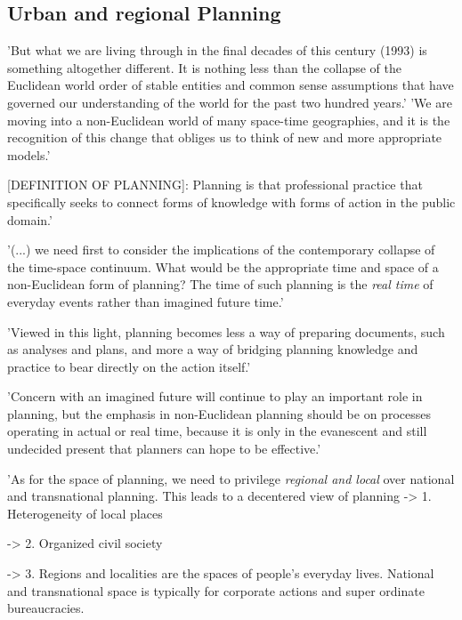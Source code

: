 \subsection{Urban and regional Planning}
\parencite{Friedmann1993}
'But what we are living through in the final decades of this century (1993) is something altogether different. It is nothing less than the collapse of the Euclidean world order of stable entities and common sense assumptions that have governed our understanding of the world for the past two hundred years.'
'We are moving into a non-Euclidean world of many space-time geographies, and it is the recognition of this change that obliges us to think of new and more appropriate models.'\par

[DEFINITION OF PLANNING]:
Planning is that professional practice that specifically seeks to connect forms of knowledge with forms of action in the public domain.'\par

'(...) we need first to consider the implications of the contemporary collapse of the time-space continuum. What would be the appropriate time and space of a non-Euclidean form of planning? The time of such planning is the \textit{real time} of everyday events rather than imagined future time.'\par

'Viewed in this light, planning becomes less a way of preparing documents, such as analyses and plans, and more a way of bridging planning knowledge and practice to bear directly on the action itself.'\par

'Concern with an imagined future will continue to play an important role in planning, but the emphasis in non-Euclidean planning should be on processes operating in actual or real time, because it is only in the evanescent and still undecided present that planners can hope to be effective.'\par

'As for the space of planning, we need to privilege \textit{regional and local} over national and transnational planning. This leads to a decentered view of planning 
-> 1. Heterogeneity of local places \par
-> 2. Organized civil society \par
-> 3. Regions and localities are the spaces of people's everyday lives. National and transnational space is typically for corporate actions and super ordinate bureaucracies.\par







